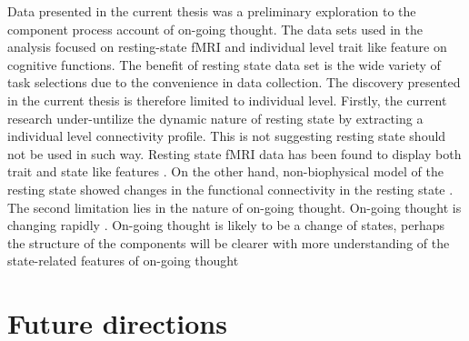 Data presented in the current thesis was a preliminary exploration to the component process account of on-going thought. The data sets used in the analysis focused on resting-state fMRI and individual level trait like feature on cognitive functions. The benefit of resting state data set is the wide variety of task selections due to the convenience in data collection. The discovery presented in the current thesis is therefore limited to individual level. Firstly, the current research under-untilize the dynamic nature of resting state by extracting a individual level connectivity profile. This is not suggesting resting state should not be used in such way. Resting state fMRI data has been found to display both trait and state like features \cite{Geerligs2015}. On the other hand, non-biophysical model of the resting state showed changes in the functional connectivity in the resting state \cite{Vidaurre2017}. The second limitation lies in the nature of on-going thought. On-going thought is changing rapidly \cite{KucyiNI2017}. On-going thought is likely to be a change of states, perhaps the structure of the components will be clearer with more understanding of the state-related features of on-going thought


\section{Future directions}
\label{ch:discussion:future}

